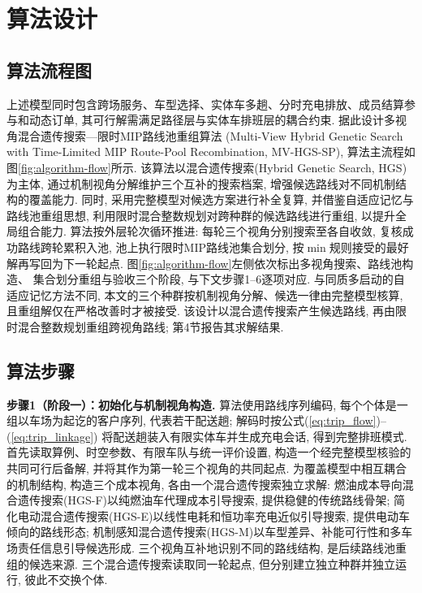 \documentclass{setp-new}
\begin{document}
\section{算法设计}

\subsection{算法流程图}

上述模型同时包含跨场服务、车型选择、实体车多趟、分时充电排放、成员结算参与和动态订单,
其可行解需满足路径层与实体车排班层的耦合约束.
据此设计多视角混合遗传搜索—限时MIP路线池重组算法
(Multi-View Hybrid Genetic Search with Time-Limited MIP Route-Pool Recombination, MV-HGS-SP),
算法主流程如图\ref{fig:algorithm-flow}所示.
该算法以混合遗传搜索(Hybrid Genetic Search, HGS)\cite{ref:76,ref:77}为主体,
通过机制视角分解维护三个互补的搜索档案, 增强候选路线对不同机制结构的覆盖能力.
同时, 采用完整模型对候选方案进行补全复算,
并借鉴自适应记忆与路线池重组思想\cite{ref:79,ref:80},
利用限时混合整数规划对跨种群的候选路线进行重组, 以提升全局组合能力.
算法按外层轮次循环推进: 每轮三个视角分别搜索至各自收敛,
复核成功路线跨轮累积入池, 池上执行限时MIP路线池集合划分,
按$\min$规则接受的最好解再写回为下一轮起点.
图\ref{fig:algorithm-flow}左侧依次标出多视角搜索、路线池构造、
集合划分重组与验收三个阶段, 与下文步骤1--6逐项对应.
与同质多启动的自适应记忆方法不同,
本文的三个种群按机制视角分解、候选一律由完整模型核算,
且重组解仅在严格改善时才被接受.
该设计以混合遗传搜索产生候选路线, 再由限时混合整数规划重组跨视角路线;
第4节报告其求解结果.



\subsection{算法步骤}

\textbf{步骤1（阶段一）：初始化与机制视角构造.}
算法使用路线序列编码, 每个个体是一组以车场为起讫的客户序列,
代表若干配送趟; 解码时按公式(\ref{eq:trip_flow})--(\ref{eq:trip_linkage})
将配送趟装入有限实体车并生成充电会话, 得到完整排班模式.
首先读取算例、时空参数、有限车队与统一评价设置, 构造一个经完整模型核验的共同可行后备解,
并将其作为第一轮三个视角的共同起点.
为覆盖模型中相互耦合的机制结构, 构造三个成本视角, 各由一个混合遗传搜索独立求解:
燃油成本导向混合遗传搜索(HGS-F)以纯燃油车代理成本引导搜索, 提供稳健的传统路线骨架;
简化电动混合遗传搜索(HGS-E)以线性电耗和恒功率充电近似引导搜索, 提供电动车倾向的路线形态;
机制感知混合遗传搜索(HGS-M)以车型差异、补能可行性和多车场责任信息引导候选形成.
三个视角互补地识别不同的路线结构, 是后续路线池重组的候选来源.
三个混合遗传搜索读取同一轮起点, 但分别建立独立种群并独立运行, 彼此不交换个体.
\end{document}
